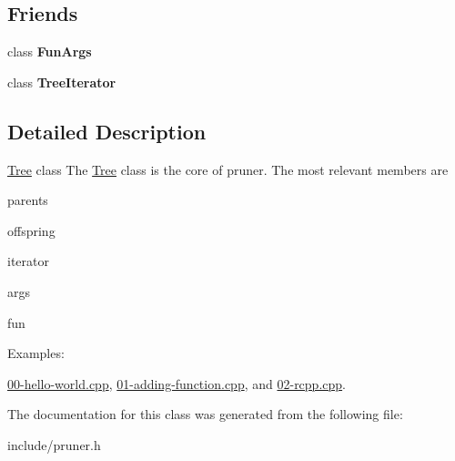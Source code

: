 \subsection*{Friends}
\begin{DoxyCompactItemize}
\item 
class {\bfseries Fun\+Args}\hypertarget{classpruner_1_1Tree_a667d4fbc407b7cce57e87064b934f905}{}\label{classpruner_1_1Tree_a667d4fbc407b7cce57e87064b934f905}

\item 
class {\bfseries Tree\+Iterator}\hypertarget{classpruner_1_1Tree_a925e5a7f5dc110e63f7062d0e6898af9}{}\label{classpruner_1_1Tree_a925e5a7f5dc110e63f7062d0e6898af9}

\end{DoxyCompactItemize}


\subsection{Detailed Description}
\hyperlink{classpruner_1_1Tree}{Tree} class The \hyperlink{classpruner_1_1Tree}{Tree} class is the core of pruner. The most relevant members are
\begin{DoxyItemize}
\item {\ttfamily parents}
\item {\ttfamily offspring}
\item {\ttfamily iterator}
\item {\ttfamily args}
\item {\ttfamily fun} 
\end{DoxyItemize}\begin{Desc}
\item[Examples\+: ]\par
\hyperlink{00-hello-world_8cpp-example}{00-\/hello-\/world.\+cpp}, \hyperlink{01-adding-function_8cpp-example}{01-\/adding-\/function.\+cpp}, and \hyperlink{02-rcpp_8cpp-example}{02-\/rcpp.\+cpp}.\end{Desc}


The documentation for this class was generated from the following file\+:\begin{DoxyCompactItemize}
\item 
include/pruner.\+h\end{DoxyCompactItemize}
